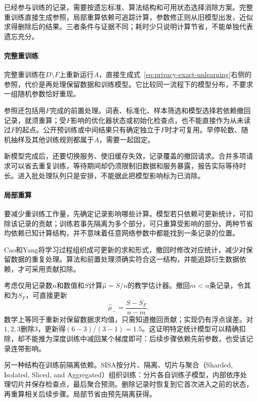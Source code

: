 已经参与训练的记录，需要按遗忘标准、算法结构和可用状态选择消除方案。完整重训练直接生成参照，局部重算依赖可追踪计算，参数修正则从旧模型出发，近似求得删除后的结果。三者条件与证据不同；耗时少只说明计算节省，不能单独代表遗忘充分。

\paragraph{完整重训练}

完整重训练在$D\setminus F$上重新运行$A$，直接生成式~\eqref{eq:privacy-exact-unlearning}右侧的参照，代价是再处理保留数据和训练模型。它比较同一流程下的模型分布，不要求一组随机参数恰好重现。

参照还包括用$F$完成的前置处理。词表、标准化、样本筛选和模型选择若依赖撤回记录，就须重算；受$F$影响的优化器状态或初始化检查点，也不能直接作为从未读过$F$的起点。公开预训练或中间结果只有确定独立于$F$时才可复用。早停轮数、随机抽样及其他训练规则都属于$A$，需要一起固定。

新模型完成后，还要切换服务、使旧缓存失效，记录覆盖的撤回请求。合并多项请求可以省去重复训练，等待期间却仍须限制旧数据和服务暴露，报告实际等待时长。进入批处理队列只是安排，不能据此把模型影响标为已消除。

\paragraph{局部重算}

要减少重训练工作量，先确定记录影响哪些计算。模型若只依赖可更新统计，可扣除该记录的贡献；训练若事先隔离为多个部分，可只重算受影响的部分。两种节省均依赖已知计算结构，并不意味着任意网络参数中都能找到一条记录的位置。

Cao和Yang将学习过程组织成可更新的求和形式，撤回时修改对应统计，减少对保留数据的重复处理。算法和前置处理须确实符合这一结构，并能追踪衍生数据依赖，才可采用贡献扣除。

考虑仅用记录数$n$和数值和$S$计算$\hat\mu=S/n$的教学估计器。撤回$m<n$条记录，令其和为$S_F$，可直接更新
\[
 \hat\mu_- =\frac{S-S_F}{n-m}.
\]
数学上等同于重新对保留数据求均值，只需知道撤回贡献；实现仍有浮点误差。对$1,2,3$删除3，更新得$(6-3)/(3-1)=1.5$。这证明特定统计模型可以精确扣除，却不能推为深度训练中减回某个梯度即可：后续步骤依赖先前参数，也受该记录连带影响。

另一种结构在训练前隔离依赖。SISA按分片、隔离、切片与聚合（Sharded, Isolated, Sliced, and Aggregated）组织训练：分片各自训练子模型，内部依序处理切片并保存检查点，最后聚合预测。删除记录时恢复到它首次进入之前的状态，再重算相关后续步骤。局部节省由预先隔离获得。

